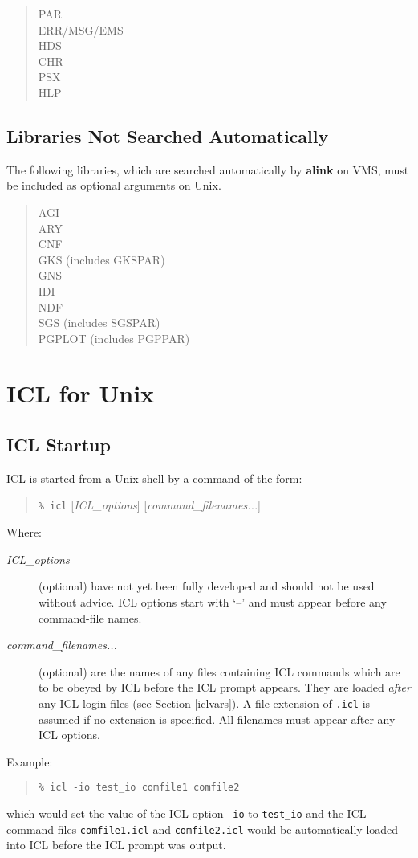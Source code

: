 \begin{verse}
PAR \\
ERR/MSG/EMS \\
HDS \\
CHR \\
PSX \\
HLP
\end{verse}

\subsection*{Libraries Not Searched Automatically}
\label{nolibs}
The following libraries, which are searched automatically by {\bf alink} on
VMS, must be included as optional arguments on Unix.

\begin{verse}
AGI \\
ARY \\
CNF \\
GKS (includes GKSPAR) \\
GNS \\
IDI \\
NDF \\
SGS (includes SGSPAR) \\
PGPLOT (includes PGPPAR) \\
\end{verse}

\section{ICL for Unix}
\label{icl}
\subsection{ICL Startup}
ICL is started from a Unix shell by a command of the form:
\begin{quote} 
\verb!% icl! [{\em ICL\_options}\/] [{\em command\_filenames...}]
\end{quote}
Where:
\begin{description}
\item[{\em ICL\_options}] (optional) have not yet been fully developed 
and should not be used without advice. ICL options start
with `--' and must appear before any command-file names.
\item[{\em command\_filenames...}] (optional) are the names of any files 
containing ICL commands which are to be obeyed by ICL before the ICL prompt 
appears.
They are loaded {\em after} any ICL login files (see Section \ref{iclvars}).
A file extension of \verb!.icl! is assumed if no extension is specified. 
All filenames must appear after any ICL options.
\end{description}
Example:
\begin{quote} \begin{verbatim}
% icl -io test_io comfile1 comfile2
\end{verbatim} \end{quote}
which would set the value of the ICL option \verb!-io! to \verb!test_io!
and the ICL command files \verb!comfile1.icl! and \verb!comfile2.icl! would be 
automatically loaded into ICL before the ICL prompt was output.

